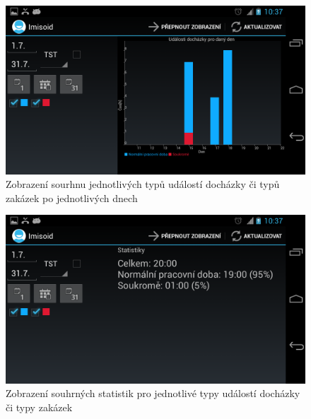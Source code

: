 \documentclass{diplomka}
\begin{document}
\begin{figure}[H]
  \centering
  \includegraphics[scale=0.25]{scr/stackchart.png}
  \caption{Zobrazení sourhnu jednotlivých typů událostí docházky či typů zakázek po jednotlivých dnech}
  \label{fig:stackchart}
\end{figure}

\begin{figure}[H]
  \centering
  \includegraphics[scale=0.25]{scr/stats.png}
   \caption{Zobrazení souhrných statistik pro jednotlivé typy událostí docházky či typy zakázek}
  \label{fig:stats}
\end{figure}
\vspace{-15 mm}
\end{document}
